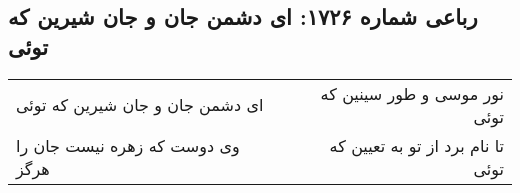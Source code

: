 \begin{center}
\section*{رباعی شماره ۱۷۲۶: ای دشمن جان و جان شیرین که توئی}
\label{sec:1726}
\begin{longtable}{l p{0.5cm} r}
ای دشمن جان و جان شیرین که توئی
&&
نور موسی و طور سینین که توئی
\\
وی دوست که زهره نیست جان را هرگز
&&
تا نام برد از تو به تعیین که توئی
\\
\end{longtable}
\end{center}
